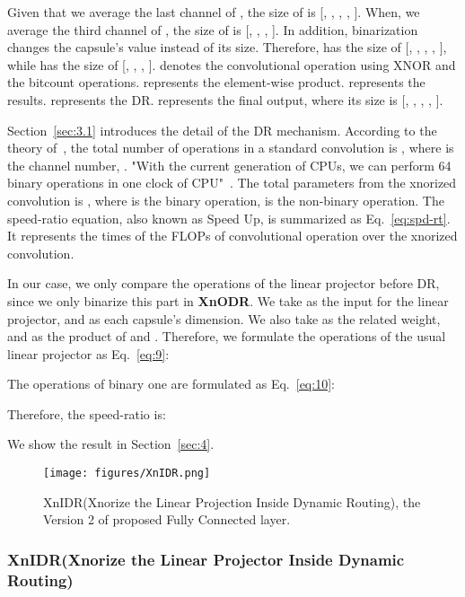 \documentclass[sn-mathphys,iicol,Numbered]{sn-jnl}
\begin{document}
Given that we average the last channel of , the size of  is [, , , , ]. When, we average the third channel of , the size of  is [, , , ]. In addition, binarization changes the capsule's value instead of its size. Therefore,  has the size of [, , , , ], while  has the size of [, , , ].  denotes the convolutional operation using XNOR and the bitcount operations.  represents the element-wise product.  represents the results.  represents the DR.  represents the final output, where its size is [, , , , ].

Section~\ref{sec:3.1} introduces the detail of the DR mechanism. According to the theory of~\cite{A2_xnor}, the total number of operations in a standard convolution is , where  is the channel number, . "With the current generation of CPUs, we can perform 64 binary operations in one clock of CPU"~\citep{A2_xnor}. The total parameters from the xnorized convolution is , where  is the binary operation,  is the  non-binary operation. The speed-ratio equation, also known as Speed Up, is summarized as Eq.~\ref{eq:spd-rt}. It represents the times of the FLOPs of convolutional operation over the xnorized convolution.



In our case, we only compare the operations of the linear projector before DR, since we only binarize this part in \textbf{XnODR}. We take  as the input for the linear projector, and  as each capsule's dimension. We also take  as the related weight, and  as the product of  and . Therefore, we formulate the operations of the usual linear projector as Eq.~\ref{eq:9}:

\vspace{-0.5cm}


The operations of binary one are formulated as Eq.~\ref{eq:10}:


Therefore, the speed-ratio is:
\vspace{-0.4cm}


We show the result in Section~\ref{sec:4}.

\begin{figure} [ht]
\centering
\caption{XnIDR(Xnorize the Linear Projection Inside Dynamic Routing), the Version 2 of proposed Fully Connected layer.}
\texttt{[image: figures/XnIDR.png]}
\vspace{-0.7cm}
\label{fig:XnIDR}
\end{figure}

\subsubsection{XnIDR(Xnorize the Linear Projector Inside Dynamic Routing)}\label{sec:3.3.2}
\end{document}

